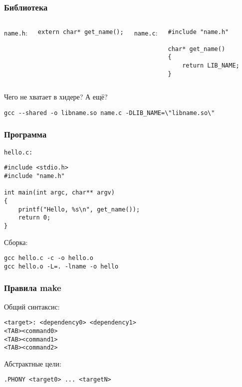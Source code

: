 \begin{frame}[fragile]
	\frametitle{Библиотека}

	\begin{columns}
		{\tt name.h}:

		\begin{lstlisting}
extern char* get_name();
		\end{lstlisting}

		{\tt name.c}:

		\begin{lstlisting}
#include "name.h"

char* get_name()
{
    return LIB_NAME;
}
		\end{lstlisting}
	\end{columns}
	
	\begin{center}
	Чего не хватает в хидере? А ещё?
\end{center}
\pause
	\begin{lstlisting}
gcc --shared -o libname.so name.c -DLIB_NAME=\"libname.so\"
	\end{lstlisting}
\end{frame}

\begin{frame}[fragile]
	\frametitle{Программа}

	{\tt hello.с:}

	\begin{lstlisting}
#include <stdio.h>
#include "name.h"

int main(int argc, char** argv)
{
    printf("Hello, %s\n", get_name());
    return 0;
}
	\end{lstlisting}

	Сборка:

	\begin{verbatim}
gcc hello.c -c -o hello.o
gcc hello.o -L=. -lname -o hello
	\end{verbatim}
\end{frame}

\begin{frame}[fragile]
	\frametitle{Правила make}

	Общий синтаксис:
	\begin{verbatim}
<target>: <dependency0> <dependency1>
<TAB><command0>
<TAB><command1>
<TAB><command2>
	\end{verbatim}

	Абстрактные цели:
	\begin{verbatim}
.PHONY <target0> ... <targetN>
	\end{verbatim}
\end{frame}

